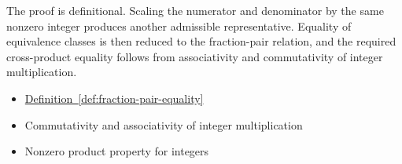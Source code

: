 \begin{remark*}
The proof is definitional. Scaling the numerator and denominator by the
same nonzero integer produces another admissible representative. Equality
of equivalence classes is then reduced to the fraction-pair relation, and
the required cross-product equality follows from associativity and
commutativity of integer multiplication.
\end{remark*}

\begin{dependencies}
\begin{itemize}
  \item \hyperref[def:fraction-pair-equality]{Definition~\ref*{def:fraction-pair-equality}}
  \item Commutativity and associativity of integer multiplication
  \item Nonzero product property for integers
\end{itemize}
\end{dependencies}



